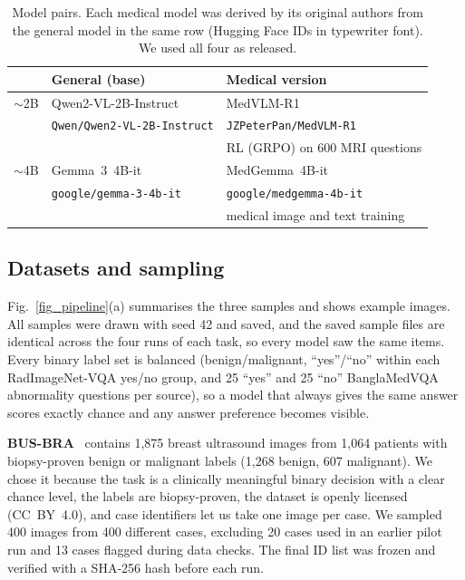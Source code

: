 \documentclass[doublecolumn]{ijcvsplatex}
\newcommand{\qwen}{Qwen2-VL}
\newcommand{\medvlm}{MedVLM-R1}
\newcommand{\gemma}{Gemma~3}
\newcommand{\medgemma}{MedGemma}
\begin{document}
\begin{table}[tb]
\centering
\caption{Model pairs. Each medical model was derived by its original authors from the general model in the same row (Hugging Face IDs in typewriter font). We used all four as released.}
\label{tab_models}
\footnotesize
\setlength{\tabcolsep}{3pt}
\begin{tabular}{@{}lll@{}}
\toprule
 & \textbf{General (base)} & \textbf{Medical version} \\
\midrule
$\sim$2B & \qwen{}-2B-Instruct~\cite{wang2024qwen2vl} & \medvlm{}~\cite{pan2025medvlmr1} \\
 & \scriptsize\texttt{Qwen/Qwen2-VL-2B-Instruct} & \scriptsize\texttt{JZPeterPan/MedVLM-R1} \\
 & & \scriptsize RL (GRPO) on 600 MRI questions \\
\midrule
$\sim$4B & \gemma{}~4B-it~\cite{gemma3} & \medgemma{}~4B-it~\cite{sellergren2025medgemma} \\
 & \scriptsize\texttt{google/gemma-3-4b-it} & \scriptsize\texttt{google/medgemma-4b-it} \\
 & & \scriptsize medical image and text training \\
\bottomrule
\end{tabular}
\end{table}

\subsection{Datasets and sampling}
\label{sec_data}
Fig.~\ref{fig_pipeline}(a) summarises the three samples and shows example images. All samples were drawn with seed 42 and saved, and the saved sample files are identical across the four runs of each task, so every model saw the same items. Every binary label set is balanced (benign/malignant, ``yes''/``no'' within each RadImageNet-VQA yes/no group, and 25 ``yes'' and 25 ``no'' BanglaMedVQA abnormality questions per source), so a model that always gives the same answer scores exactly chance and any answer preference becomes visible.

\textbf{BUS-BRA}~\cite{gomezflores2024busbra} contains 1,875 breast ultrasound images from 1,064 patients with biopsy-proven benign or malignant labels (1,268 benign, 607 malignant). We chose it because the task is a clinically meaningful binary decision with a clear chance level, the labels are biopsy-proven, the dataset is openly licensed (CC~BY~4.0), and case identifiers let us take one image per case. We sampled 400 images from 400 different cases, excluding 20 cases used in an earlier pilot run and 13 cases flagged during data checks. The final ID list was frozen and verified with a SHA-256 hash before each run.
\end{document}
